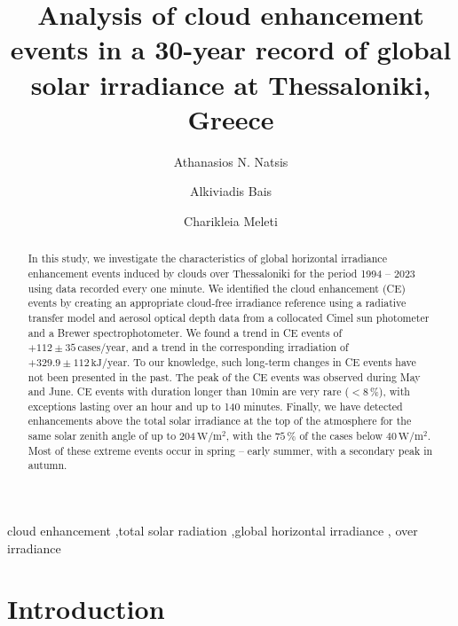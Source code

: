 \documentclass[preprint, 5p,
authoryear]{elsarticle} %
\providecommand{\DIFaddtex}[1]{{\protect\color{blue}\uwave{#1}}} %
\providecommand{\DIFdeltex}[1]{{\protect\color{red}\sout{#1}}}                      %
\providecommand{\DIFaddbegin}{} %
\providecommand{\DIFaddend}{} %
\providecommand{\DIFdelbegin}{} %
\providecommand{\DIFdelend}{} %
\providecommand{\DIFadd}[1]{\texorpdfstring{\DIFaddtex{#1}}{#1}} %
\providecommand{\DIFdel}[1]{\texorpdfstring{\DIFdeltex{#1}}{}} %
\newcommand{\DIFscaledelfig}{0.5}
\newlength{\DIFdelgraphicswidth} %
\newlength{\DIFdelgraphicsheight} %
\newcommand{\DIFaddincludegraphics}[2][]{{\color{blue}\fbox{\DIFOincludegraphics[#1]{#2}}}} %
\newcommand{\DIFdelincludegraphics}[2][]{%
\sbox{\DIFdelgraphicsbox}{\DIFOincludegraphics[#1]{#2}}%
\settoboxwidth{\DIFdelgraphicswidth}{\DIFdelgraphicsbox} %
\settoboxtotalheight{\DIFdelgraphicsheight}{\DIFdelgraphicsbox} %
\scalebox{\DIFscaledelfig}{%
\parbox[b]{\DIFdelgraphicswidth}{\usebox{\DIFdelgraphicsbox}\\[-\baselineskip] \rule{\DIFdelgraphicswidth}{0em}}\llap{\resizebox{\DIFdelgraphicswidth}{\DIFdelgraphicsheight}{%
\setlength{\unitlength}{\DIFdelgraphicswidth}%
\begin{picture}(1,1)%
\thicklines\linethickness{2pt} %
{\color[rgb]{1,0,0}\put(0,0){\framebox(1,1){}}}%
{\color[rgb]{1,0,0}\put(0,0){\line( 1,1){1}}}%
{\color[rgb]{1,0,0}\put(0,1){\line(1,-1){1}}}%
\end{picture}%
}\hspace*{3pt}}} %
} %
\DeclareRobustCommand{\DIFaddbegin}{\DIFOaddbegin \let\includegraphics\DIFaddincludegraphics} %
\DeclareRobustCommand{\DIFaddend}{\DIFOaddend \let\includegraphics\DIFOincludegraphics} %
\DeclareRobustCommand{\DIFdelbegin}{\DIFOdelbegin \let\includegraphics\DIFdelincludegraphics} %
\DeclareRobustCommand{\DIFdelend}{\DIFOaddend \let\includegraphics\DIFOincludegraphics} %
\begin{document}
\begin{frontmatter}

  \title{Analysis of cloud enhancement events in a 30-year record of
global solar irradiance at Thessaloniki, Greece}
    \author[LAP]{Athanasios N. Natsis%
  }
    \author[LAP]{Alkiviadis Bais%
  }
    \author[LAP]{Charikleia Meleti%
  }

  \begin{abstract}
  In this study, we investigate the characteristics of global horizontal
  irradiance enhancement events induced by clouds over Thessaloniki for
  the period 1994 -- 2023 using data recorded every one minute. We
  identified the cloud enhancement (CE) events by creating an
  appropriate cloud-free irradiance reference using a radiative transfer
  model and aerosol optical depth data from a collocated Cimel sun
  photometer and a Brewer spectrophotometer. We found a trend in CE
  events of \(+112\pm 35\,\text{cases}/\text{year}\), and a trend in the
  corresponding irradiation of
  \DIFdelbegin \DIFdel{\(+329.9\pm 112\,\text{kJ}/\text{year}\)}\DIFdelend \DIFaddbegin \DIFadd{\(+329.9\pm 112.0\,\text{kJ}/\text{year}\)}\DIFaddend . To our knowledge, such
  long-term changes in CE events have not been presented in the past.
  The peak of the CE events was observed during May and June. CE events
  with duration longer than 10\nobreakspace{}min are very rare
  (\(<8\,\%\)), with exceptions lasting over an hour and up to 140
  minutes. Finally, we have detected enhancements above the total solar
  irradiance at the top of the atmosphere for the same solar zenith
  angle of up to \(204\,\text{W}/\text{m}^{2}\), with the \(75\,\%\) of
  the cases below \(40\,\text{W}/\text{m}^{2}\). Most of these extreme
  events occur in spring -- early summer, with a secondary peak in
  autumn.
  \end{abstract}
    \begin{keyword}
    cloud enhancement \sep total solar radiation \sep global horizontal
irradiance \sep 
    over irradiance
  \end{keyword}

 \end{frontmatter}

\hypertarget{introduction}{%
\section{Introduction}\label{introduction}}
\end{document}

